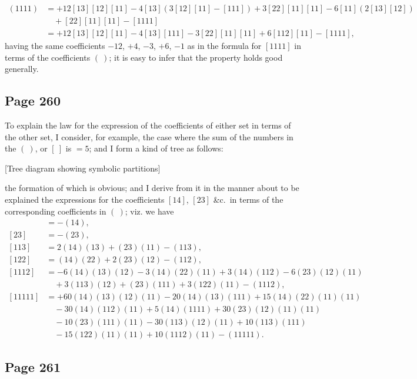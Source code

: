 \documentclass[11pt,a4paper]{article}
\theoremstyle{definition}
\begin{document}
\begin{align*}
(1111) &= +12[13][12][11] - 4[13](3[12][11] - [111]) + 3[22][11][11] - 6[11](2[13][12])\\
&\quad + [22][11][11] - [1111]\\
&= +12[13][12][11] - 4[13][111] - 3[22][11][11] + 6[112][11] - [1111],
\end{align*}
having the same coefficients $-12$, $+4$, $-3$, $+6$, $-1$ as in the formula for $[1111]$ in terms of the coefficients $(\ )$; it is easy to infer that the property holds good generally.

\subsection*{Page 260}

To explain the law for the expression of the coefficients of either set in terms of the other set, I consider, for example, the case where the sum of the numbers in the $(\ )$, or $[\ ]$ is $= 5$; and I form a kind of tree as follows:
\begin{center}
[Tree diagram showing symbolic partitions]
\end{center}
the formation of which is obvious; and I derive from it in the manner about to be explained the expressions for the coefficients $[14]$, $[23]$ \&c.\ in terms of the corresponding coefficients in $(\ )$; viz. we have
\begin{align*}
[14] &= - (14),\\
[23] &= - (23),\\
[113] &= 2(14)(13) + (23)(11) - (113),\\
[122] &= (14)(22) + 2(23)(12) - (112),\\
[1112] &= -6(14)(13)(12) - 3(14)(22)(11) + 3(14)(112) - 6(23)(12)(11)\\
&\quad + 3(113)(12) + (23)(111) + 3(122)(11) - (1112),\\
[11111] &= +60(14)(13)(12)(11) - 20(14)(13)(111) + 15(14)(22)(11)(11)\\
&\quad - 30(14)(112)(11) + 5(14)(1111) + 30(23)(12)(11)(11)\\
&\quad - 10(23)(111)(11) - 30(113)(12)(11) + 10(113)(111)\\
&\quad - 15(122)(11)(11) + 10(1112)(11) - (11111).
\end{align*}

\subsection*{Page 261}
\end{document}
